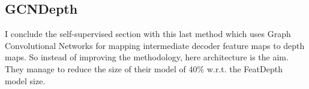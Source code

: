 \subsection{GCNDepth}
I conclude the self-supervised section with this last method \cite{GCNDepth} which uses Graph Convolutional Networks for mapping intermediate decoder feature maps to depth maps. So instead of improving the methodology, here architecture is the aim. They manage to reduce the size of their model of 40\% w.r.t. the FeatDepth model size.
